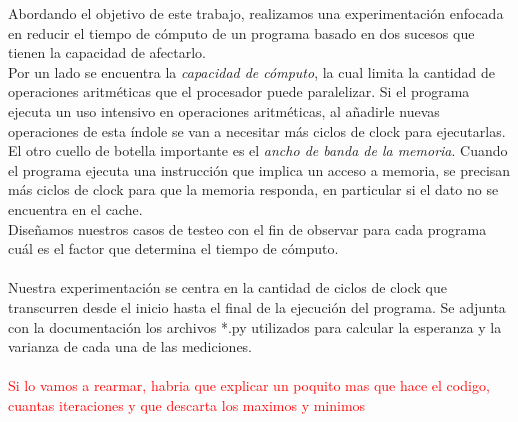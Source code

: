 \documentclass[a4paper]{article}
\begin{document}
Abordando el objetivo de este trabajo, realizamos una experimentaci\'on enfocada en reducir el tiempo de c\'omputo de un programa basado en dos sucesos que tienen la capacidad de afectarlo. \\
\indent Por un lado se encuentra la \textit{capacidad de c\'omputo}, la cual limita la cantidad de operaciones aritm\'eticas que el procesador puede paralelizar. Si el programa ejecuta un uso intensivo en operaciones aritm\'eticas, al añadirle nuevas operaciones de esta \'indole se van a necesitar m\'as ciclos de clock para ejecutarlas. \\
\indent El otro cuello de botella importante es el \textit{ancho de banda de la memoria}. Cuando el programa ejecuta una instrucci\'on que implica un acceso a memoria, se precisan m\'as ciclos de clock para que la memoria responda, en particular si el dato no se encuentra en el cache.\\
\indent Diseñamos nuestros casos de testeo con el fin de observar para cada programa cu\'al es el factor que determina el tiempo de c\'omputo.\\
\\
\indent Nuestra experimentaci\'on se centra en la cantidad de ciclos de clock que transcurren desde el inicio hasta el final de la ejecuci\'on del programa. Se adjunta con la documentaci\'on los archivos *.py utilizados para calcular la esperanza y la varianza de cada una de las mediciones.\\
\\
\textcolor{red}{Si lo vamos a rearmar, habria que explicar un poquito mas que hace el codigo, cuantas iteraciones y que descarta los maximos y minimos}\\



%
%
%
\newpage
\end{document}
